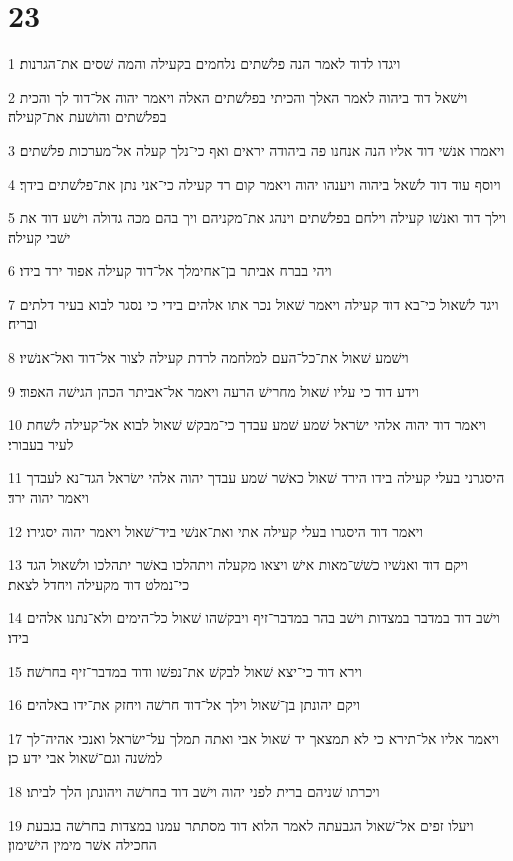 \chapter{23}

\par 1 ויגדו לדוד לאמר הנה פלשׁתים נלחמים בקעילה והמה שׁסים את־הגרנות׃
\par 2 וישׁאל דוד ביהוה לאמר האלך והכיתי בפלשׁתים האלה ויאמר יהוה אל־דוד לך והכית בפלשׁתים והושׁעת את־קעילה׃
\par 3 ויאמרו אנשׁי דוד אליו הנה אנחנו פה ביהודה יראים ואף כי־נלך קעלה אל־מערכות פלשׁתים׃
\par 4 ויוסף עוד דוד לשׁאל ביהוה ויענהו יהוה ויאמר קום רד קעילה כי־אני נתן את־פלשׁתים בידך׃
\par 5 וילך דוד ואנשׁו קעילה וילחם בפלשׁתים וינהג את־מקניהם ויך בהם מכה גדולה וישׁע דוד את ישׁבי קעילה׃
\par 6 ויהי בברח אביתר בן־אחימלך אל־דוד קעילה אפוד ירד בידו׃
\par 7 ויגד לשׁאול כי־בא דוד קעילה ויאמר שׁאול נכר אתו אלהים בידי כי נסגר לבוא בעיר דלתים ובריח׃
\par 8 וישׁמע שׁאול את־כל־העם למלחמה לרדת קעילה לצור אל־דוד ואל־אנשׁיו׃
\par 9 וידע דוד כי עליו שׁאול מחרישׁ הרעה ויאמר אל־אביתר הכהן הגישׁה האפוד׃
\par 10 ויאמר דוד יהוה אלהי ישׂראל שׁמע שׁמע עבדך כי־מבקשׁ שׁאול לבוא אל־קעילה לשׁחת לעיר בעבורי׃
\par 11 היסגרני בעלי קעילה בידו הירד שׁאול כאשׁר שׁמע עבדך יהוה אלהי ישׂראל הגד־נא לעבדך ויאמר יהוה ירד׃
\par 12 ויאמר דוד היסגרו בעלי קעילה אתי ואת־אנשׁי ביד־שׁאול ויאמר יהוה יסגירו׃
\par 13 ויקם דוד ואנשׁיו כשׁשׁ־מאות אישׁ ויצאו מקעלה ויתהלכו באשׁר יתהלכו ולשׁאול הגד כי־נמלט דוד מקעילה ויחדל לצאת׃
\par 14 וישׁב דוד במדבר במצדות וישׁב בהר במדבר־זיף ויבקשׁהו שׁאול כל־הימים ולא־נתנו אלהים בידו׃
\par 15 וירא דוד כי־יצא שׁאול לבקשׁ את־נפשׁו ודוד במדבר־זיף בחרשׁה׃
\par 16 ויקם יהונתן בן־שׁאול וילך אל־דוד חרשׁה ויחזק את־ידו באלהים׃
\par 17 ויאמר אליו אל־תירא כי לא תמצאך יד שׁאול אבי ואתה תמלך על־ישׂראל ואנכי אהיה־לך למשׁנה וגם־שׁאול אבי ידע כן׃
\par 18 ויכרתו שׁניהם ברית לפני יהוה וישׁב דוד בחרשׁה ויהונתן הלך לביתו׃
\par 19 ויעלו זפים אל־שׁאול הגבעתה לאמר הלוא דוד מסתתר עמנו במצדות בחרשׁה בגבעת החכילה אשׁר מימין הישׁימון׃
